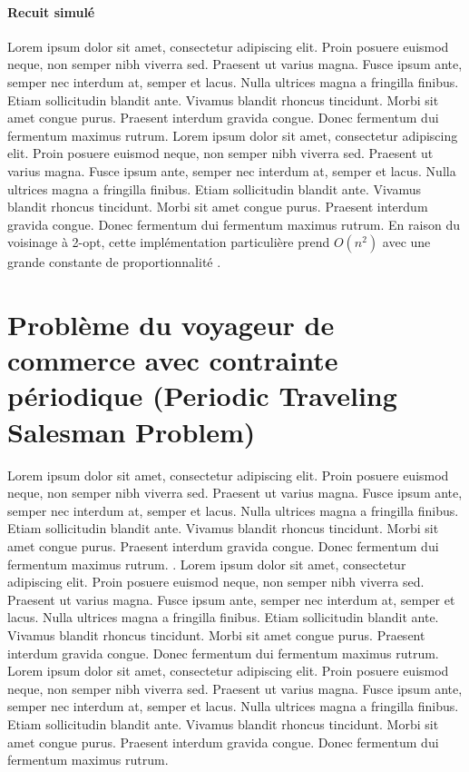 \medskip

\paragraph{Recuit simulé}
Lorem ipsum dolor sit amet, consectetur adipiscing elit. Proin posuere euismod neque, non semper nibh viverra sed. Praesent ut varius magna. Fusce ipsum ante, semper nec interdum at, semper et lacus. Nulla ultrices magna a fringilla finibus. Etiam sollicitudin blandit ante. Vivamus blandit rhoncus tincidunt. Morbi sit amet congue purus. Praesent interdum gravida congue. Donec fermentum dui fermentum maximus rutrum. \parencite{johnson_traveling_1995} Lorem ipsum dolor sit amet, consectetur adipiscing elit. Proin posuere euismod neque, non semper nibh viverra sed. Praesent ut varius magna. Fusce ipsum ante, semper nec interdum at, semper et lacus. Nulla ultrices magna a fringilla finibus. Etiam sollicitudin blandit ante. Vivamus blandit rhoncus tincidunt. Morbi sit amet congue purus. Praesent interdum gravida congue. Donec fermentum dui fermentum maximus rutrum. En raison du voisinage à 2-opt, cette implémentation particulière prend $O(n^2)$ avec une grande constante de proportionnalité \parencite{davendra_traveling_2010}.

\medskip

\section{Problème du voyageur de commerce avec contrainte périodique (Periodic Traveling Salesman Problem)}
\label{sec:ptsp}
Lorem ipsum dolor sit amet, consectetur adipiscing elit. Proin posuere euismod neque, non semper nibh viverra sed. Praesent ut varius magna. Fusce ipsum ante, semper nec interdum at, semper et lacus. Nulla ultrices magna a fringilla finibus. Etiam sollicitudin blandit ante. Vivamus blandit rhoncus tincidunt. Morbi sit amet congue purus. Praesent interdum gravida congue. Donec fermentum dui fermentum maximus rutrum. \parencite{paletta_period_2002}. Lorem ipsum dolor sit amet, consectetur adipiscing elit. Proin posuere euismod neque, non semper nibh viverra sed. Praesent ut varius magna. Fusce ipsum ante, semper nec interdum at, semper et lacus. Nulla ultrices magna a fringilla finibus. Etiam sollicitudin blandit ante. Vivamus blandit rhoncus tincidunt. Morbi sit amet congue purus. Praesent interdum gravida congue. Donec fermentum dui fermentum maximus rutrum. \parencite{cordeau_tabu_1997}Lorem ipsum dolor sit amet, consectetur adipiscing elit. Proin posuere euismod neque, non semper nibh viverra sed. Praesent ut varius magna. Fusce ipsum ante, semper nec interdum at, semper et lacus. Nulla ultrices magna a fringilla finibus. Etiam sollicitudin blandit ante. Vivamus blandit rhoncus tincidunt. Morbi sit amet congue purus. Praesent interdum gravida congue. Donec fermentum dui fermentum maximus rutrum.

